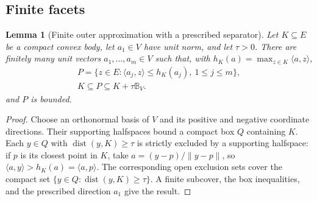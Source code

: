 \documentclass[journal,10pt]{IEEEtran}
\newtheorem{lemma}{Lemma}
\theoremstyle{definition}\newtheorem{definition}{Definition}
\theoremstyle{remark}
\newcommand{\dist}{\operatorname{dist}}
\newcommand{\ball}{\mathbb B_V}
\begin{document}
\subsection{Finite facets}
\begin{lemma}[Finite outer approximation with a prescribed separator]\label{lem:poly}
Let $K\subseteq E$ be a compact convex body, let $a_1\in V$ have unit norm, and let $\tau>0$. There are finitely many unit vectors $a_1,\ldots,a_m\in V$ such that, with $h_K(a)=\max_{z\in K}\langle a,z\rangle$,
\[
\begin{gathered}
 P=\{z\in E:\langle a_j,z\rangle\leq h_K(a_j),\ 1\leq j\leq m\},\\
 K\subseteq P\subseteq K+\tau\ball.
\end{gathered}
\]
and $P$ is bounded.
\end{lemma}
\begin{proof}
Choose an orthonormal basis of $V$ and its positive and negative coordinate directions. Their supporting halfspaces bound a compact box $Q$ containing $K$. Each $y\in Q$ with $\dist(y,K)\geq\tau$ is strictly excluded by a supporting halfspace: if $p$ is its closest point in $K$, take $a=(y-p)/\|y-p\|$, so $\langle a,y\rangle>h_K(a)=\langle a,p\rangle$. The corresponding open exclusion sets cover the compact set $\{y\in Q:\dist(y,K)\geq\tau\}$. A finite subcover, the box inequalities, and the prescribed direction $a_1$ give the result.
\end{proof}
\end{document}
